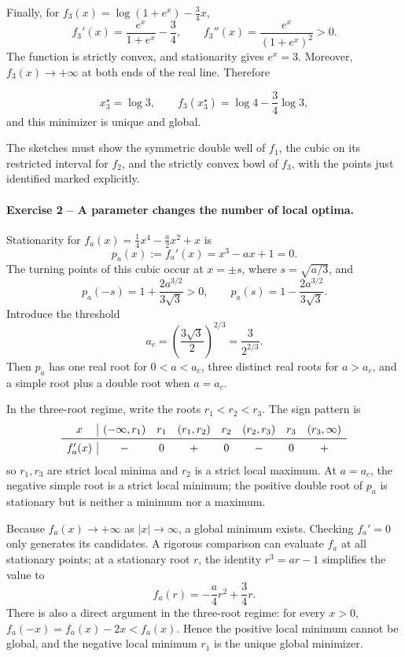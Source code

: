 \documentclass[10pt]{article}
\begin{document}
Finally, for
\(f_3(x)=\log(1+e^x)-\frac34x\),
\[
f_3'(x)=\frac{e^x}{1+e^x}-\frac34,
\qquad
f_3''(x)=\frac{e^x}{(1+e^x)^2}>0.
\]
The function is strictly convex, and stationarity gives \(e^x=3\). Moreover,
\(f_3(x)\to+\infty\) at both ends of the real line. Therefore
\begin{resultbox}
\[
x_3^\star=\log3,
\qquad
f_3(x_3^\star)=\log4-\frac34\log3,
\]
and this minimizer is unique and global.
\end{resultbox}
The sketches must show the symmetric double well of \(f_1\), the cubic on its
restricted interval for \(f_2\), and the strictly convex bowl of \(f_3\), with
the points just identified marked explicitly.

\paragraph{Exercise 2 -- A parameter changes the number of local optima.}

Stationarity for
\(f_a(x)=\frac14x^4-\frac a2x^2+x\) is
\[
p_a(x):=f_a'(x)=x^3-ax+1=0.
\]
The turning points of this cubic occur at \(x=\pm s\), where
\(s=\sqrt{a/3}\), and
\[
p_a(-s)=1+\frac{2a^{3/2}}{3\sqrt3}>0,
\qquad
p_a(s)=1-\frac{2a^{3/2}}{3\sqrt3}.
\]
Introduce the threshold
\[
a_c=\left(\frac{3\sqrt3}{2}\right)^{2/3}
=\frac{3}{2^{2/3}}.
\]
Then \(p_a\) has one real root for \(0<a<a_c\), three distinct real roots for
\(a>a_c\), and a simple root plus a double root when \(a=a_c\).

In the three-root regime, write the roots \(r_1<r_2<r_3\). The sign pattern is
\[
\begin{array}{c|ccccccc}
x&(-\infty,r_1)&r_1&(r_1,r_2)&r_2&(r_2,r_3)&r_3&(r_3,\infty)\\ \midrule
f_a'(x)&-&0&+&0&-&0&+
\end{array}
\]
so \(r_1,r_3\) are strict local minima and \(r_2\) is a strict local maximum.
At \(a=a_c\), the negative simple root is a strict local minimum; the positive
double root of \(p_a\) is stationary but is neither a minimum nor a maximum.

Because \(f_a(x)\to+\infty\) as \(|x|\to\infty\), a global minimum exists.
Checking \(f_a'=0\) only generates its candidates. A rigorous comparison can
evaluate \(f_a\) at all stationary points; at a stationary root \(r\), the
identity \(r^3=ar-1\) simplifies the value to
\[
f_a(r)=-\frac a4r^2+\frac34r.
\]
There is also a direct argument in the three-root regime: for every \(x>0\),
\(f_a(-x)=f_a(x)-2x<f_a(x)\). Hence the positive local minimum cannot be
global, and the negative local minimum \(r_1\) is the unique global minimizer.
\end{document}
